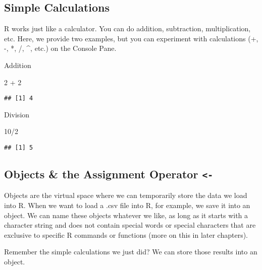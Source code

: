 \documentclass[
]{book}
\newenvironment{Shaded}{\begin{snugshade}}{\end{snugshade}}
\newcommand{\DecValTok}[1]{\textcolor[rgb]{0.00,0.00,0.81}{#1}}
\newcommand{\SpecialCharTok}[1]{\textcolor[rgb]{0.00,0.00,0.00}{#1}}
\begin{document}
\hypertarget{simple-calculations}{%
\subsection{Simple Calculations}\label{simple-calculations}}

R works just like a calculator. You can do addition, subtraction, multiplication, etc. Here, we provide two examples, but you can experiment with calculations (+, -, *, /, \^{}, etc.) on the Console Pane.

Addition

\begin{Shaded}
\begin{Highlighting}[]
\DecValTok{2} \SpecialCharTok{+} \DecValTok{2}
\end{Highlighting}
\end{Shaded}

\begin{verbatim}
## [1] 4
\end{verbatim}

Division

\begin{Shaded}
\begin{Highlighting}[]
\DecValTok{10}\SpecialCharTok{/}\DecValTok{2}
\end{Highlighting}
\end{Shaded}

\begin{verbatim}
## [1] 5
\end{verbatim}

\hypertarget{objects-the-assignment-operator--}{%
\subsection{\texorpdfstring{Objects \& the Assignment Operator \texttt{\textless{}-}}{Objects \& the Assignment Operator \textless-}}\label{objects-the-assignment-operator--}}

Objects are the virtual space where we can temporarily store the data we load into R. When we want to load a .csv file into R, for example, we save it into an object. We can name these objects whatever we like, as long as it starts with a character string and does not contain special words or special characters that are exclusive to specific R commands or functions (more on this in later chapters).

Remember the simple calculations we just did? We can store those results into an object.
\end{document}
